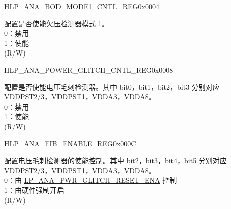 \begin{register}{H}{LP\_ANA\_BOD\_MODE1\_CNTL\_REG}{0x0004}
\label{regdesc:LPANABODMODE1CNTLREG}
%
%
\regnewline%
\begin{regdesc}\begin{reglist}
\label{fielddesc:LPANABODMODE1RESETENA}\item [LP\_ANA\_BOD\_MODE1\_RESET\_ENA]  配置是否使能欠压检测器模式 1。\\
0：禁用\\
1：使能\\
(R/W)
\end{reglist}\end{regdesc}
\end{register}

\begin{register}{H}{LP\_ANA\_POWER\_GLITCH\_CNTL\_REG}{0x0008}
\label{regdesc:LPANAPOWERGLITCHCNTLREG}
%
%
%
\regnewline%
\begin{regdesc}\begin{reglist}
\label{fielddesc:LPANAPWRGLITCHRESETENA}\item [LP\_ANA\_PWR\_GLITCH\_RESET\_ENA]  配置是否使能电压毛刺检测器。其中 bit0，bit1，bit2，bit3 分别对应 VDDPST2/3，VDDPST1，VDDA3，VDDA8。\\
0：禁用\\
1：使能\\
(R/W)
\end{reglist}\end{regdesc}
\end{register}

\begin{register}{H}{LP\_ANA\_FIB\_ENABLE\_REG}{0x000C}\label{regdesc:LPANAFIBENABLEREG}
%
\regnewline%
\begin{regdesc}\begin{reglist}
\label{fielddesc:LPANAANAFIBENA}\item [LP\_ANA\_ANA\_FIB\_ENA] 配置电压毛刺检测器的使能控制。其中 bit2，bit3，bit4，bit5 分别对应 VDDPST2/3，VDDPST1，VDDA3，VDDA8。\\
0：由 \hyperref[fielddesc:LPANAPWRGLITCHRESETENA]{LP\_ANA\_PWR\_GLITCH\_RESET\_ENA} 控制\\
1：由硬件强制开启\\
(R/W)
\end{reglist}\end{regdesc}
\end{register}

